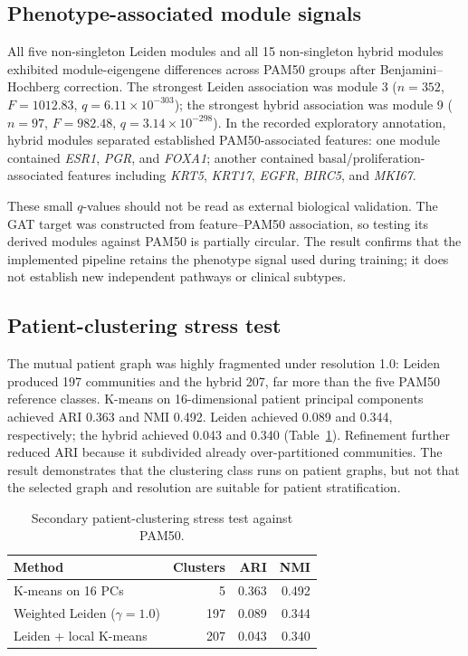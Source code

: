\documentclass[11pt]{article}
\begin{document}
\subsection{Phenotype-associated module signals}

All five non-singleton Leiden modules and all 15 non-singleton hybrid modules exhibited module-eigengene differences across PAM50 groups after Benjamini--Hochberg correction. The strongest Leiden association was module 3 ($n=352$, $F=1012.83$, $q=6.11\times10^{-303}$); the strongest hybrid association was module 9 ($n=97$, $F=982.48$, $q=3.14\times10^{-298}$). In the recorded exploratory annotation, hybrid modules separated established PAM50-associated features: one module contained \textit{ESR1}, \textit{PGR}, and \textit{FOXA1}; another contained basal/proliferation-associated features including \textit{KRT5}, \textit{KRT17}, \textit{EGFR}, \textit{BIRC5}, and \textit{MKI67}.

These small $q$-values should not be read as external biological validation. The GAT target was constructed from feature--PAM50 association, so testing its derived modules against PAM50 is partially circular. The result confirms that the implemented pipeline retains the phenotype signal used during training; it does not establish new independent pathways or clinical subtypes.

\subsection{Patient-clustering stress test}

The mutual patient graph was highly fragmented under resolution 1.0: Leiden produced 197 communities and the hybrid 207, far more than the five PAM50 reference classes. K-means on 16-dimensional patient principal components achieved ARI 0.363 and NMI 0.492. Leiden achieved 0.089 and 0.344, respectively; the hybrid achieved 0.043 and 0.340 (Table~\ref{tab:patient}). Refinement further reduced ARI because it subdivided already over-partitioned communities. The result demonstrates that the clustering class runs on patient graphs, but not that the selected graph and resolution are suitable for patient stratification.

\begin{table}[t]
\centering
\caption{Secondary patient-clustering stress test against PAM50.}
\label{tab:patient}
\begin{tabular}{lrrr}
\toprule
Method & Clusters & ARI & NMI \\
\midrule
K-means on 16 PCs & 5 & 0.363 & 0.492 \\
Weighted Leiden ($\gamma=1.0$) & 197 & 0.089 & 0.344 \\
Leiden + local K-means & 207 & 0.043 & 0.340 \\
\bottomrule
\end{tabular}
\end{table}
\end{document}
